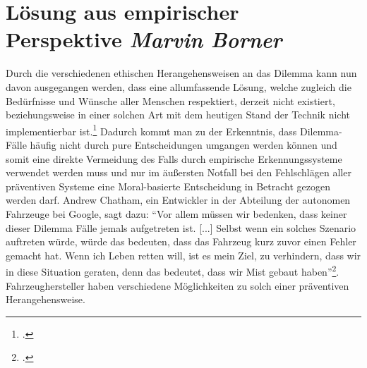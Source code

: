 \documentclass[a4paper, 12pt, openany]{book}
\newcommand\Section[2]{\section[#1 {\scriptsize\itshape#2}]{#1 \footnotesize\itshape#2}}
\begin{document}
        \Section{Lösung aus empirischer Perspektive}{Marvin Borner}
            Durch die verschiedenen ethischen Herangehensweisen an das Dilemma kann nun davon ausgegangen werden, dass eine allumfassende Lösung, welche zugleich die Bedürfnisse und Wünsche aller Menschen respektiert, derzeit nicht existiert, beziehungsweise in einer solchen Art mit dem heutigen Stand der Technik nicht implementierbar ist.\footcite[222]{scholz2016autonomes} Dadurch kommt man zu der Erkenntnis, dass Dilemma-Fälle häufig nicht durch pure Entscheidungen umgangen werden können und somit eine direkte Vermeidung des Falls durch empirische Erkennungssysteme verwendet werden muss und nur im äußersten Notfall bei den Fehlschlägen aller präventiven Systeme eine Moral-basierte Entscheidung in Betracht gezogen werden darf. Andrew Chatham, ein Entwickler in der Abteilung der autonomen Fahrzeuge bei Google, sagt dazu: \enquote{Vor allem müssen wir bedenken, dass keiner dieser Dilemma Fälle jemals aufgetreten ist. [...] Selbst wenn ein solches Szenario auftreten würde, würde das bedeuten, dass das Fahrzeug kurz zuvor einen Fehler gemacht hat. Wenn ich Leben retten will, ist es mein Ziel, zu verhindern, dass wir in diese Situation geraten, denn das bedeutet, dass wir Mist gebaut haben}\footcite{guardian2016dilemma}. Fahrzeughersteller haben verschiedene Möglichkeiten zu solch einer präventiven Herangehensweise.
            
\end{document}
